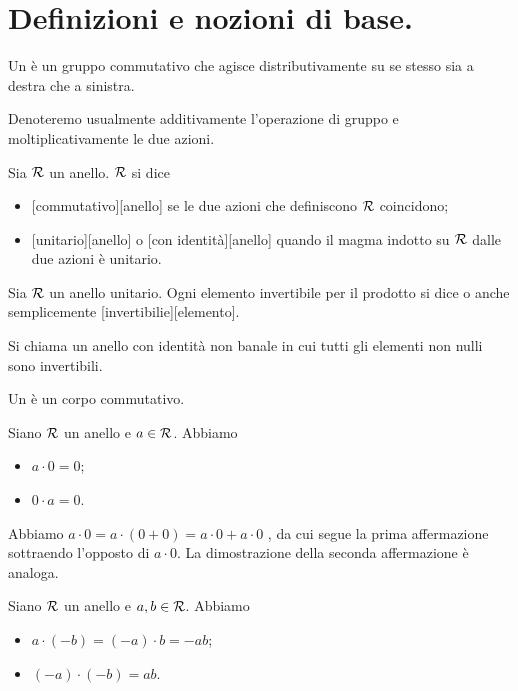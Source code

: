 \section{Definizioni e nozioni di base.}\label{DefinizioniENozioniDiBase}
\begin{Definition}
	Un  \`e un gruppo commutativo che agisce distributivamente su se stesso sia a destra che a sinistra.
\end{Definition}
\par Denoteremo usualmente additivamente l'operazione di gruppo e moltiplicativamente le due azioni.
\begin{Definition}
	Sia $\mathcal{R}$ un anello. $\mathcal{R}$ si dice
	\begin{itemize}
		\item {}[commutativo][anello] se le due azioni che definiscono $\mathcal{R}$ coincidono;
		\item {}[unitario][anello] o [con identit\`a][anello] quando il magma indotto su $\mathcal{R}$ dalle due azioni \`e unitario.
	\end{itemize}
\end{Definition}
\begin{Definition}
	Sia $\mathcal{R}$ un anello unitario. Ogni elemento invertibile per il prodotto si dice  o anche semplicemente [invertibilie][elemento].
\end{Definition}
\begin{Definition}
	Si chiama  un anello con identit\`a non banale in cui tutti gli elementi non nulli sono invertibili.
\end{Definition}
\begin{Definition}
	Un  \`e un corpo commutativo.
\end{Definition}
\begin{Theorem}
	Siano $\mathcal{R}$ un anello e $a \in \mathcal{R}$. Abbiamo
	\begin{itemize}
		\item $a \cdot 0 = 0$;
		\item $0 \cdot a = 0$.
	\end{itemize}
\end{Theorem}
\Proof Abbiamo $a \cdot 0 = a \cdot (0 + 0) = a \cdot 0 + a \cdot 0$ , da cui segue la prima affermazione sottraendo l'opposto di $a \cdot 0$. La dimostrazione della seconda affermazione \`e analoga. \EndProof
\begin{Theorem}
	Siano $\mathcal{R}$ un anello e $a, b \in \mathcal{R}$. Abbiamo
	\begin{itemize}
		\item $a \cdot (-b) = (-a) \cdot b = - ab$;
		\item $(-a) \cdot (-b) = ab$.
	\end{itemize}
\end{Theorem}
